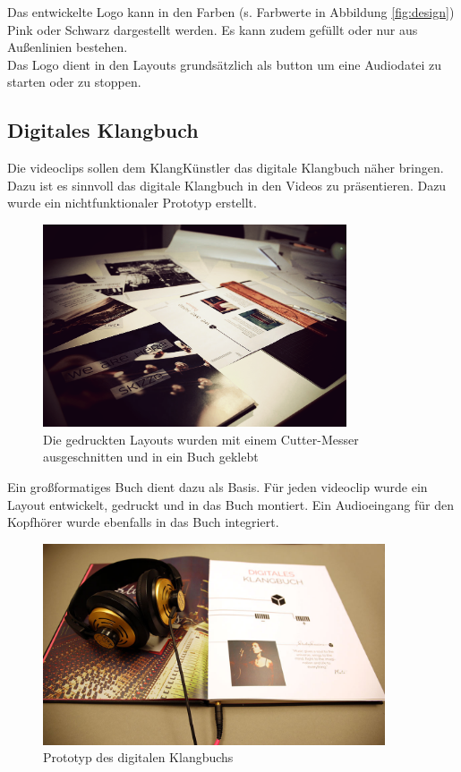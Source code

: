 Das entwickelte Logo kann in den Farben (s. Farbwerte in Abbildung \ref{fig:design}) Pink oder Schwarz dargestellt werden. Es kann zudem gefüllt oder nur aus Außenlinien bestehen.\\
Das Logo dient in den Layouts grundsätzlich als \gls{button} um eine Audiodatei zu starten oder zu stoppen.



\subsection{Digitales Klangbuch}

Die \gls{videoclip}s sollen dem KlangKünstler das digitale Klangbuch näher bringen. Dazu ist es sinnvoll das digitale Klangbuch in den Videos zu präsentieren. Dazu wurde ein nichtfunktionaler Prototyp erstellt.\\

\begin{figure}[H]
\centering
\includegraphics[width=0.8\textwidth]{grafiken/cutting.png}
\caption{Die gedruckten Layouts wurden mit einem Cutter-Messer ausgeschnitten und in ein Buch geklebt}
\end{figure}


Ein großformatiges Buch dient dazu als Basis. Für jeden \gls{videoclip} wurde ein Layout entwickelt, gedruckt und in das Buch montiert. Ein Audioeingang für den Kopfhörer wurde ebenfalls in das Buch integriert.\\


\begin{figure}[H]
\centering
\includegraphics[width=0.9\textwidth]{grafiken/gebautes_klangbuch.jpg}
\caption{Prototyp des digitalen Klangbuchs}
\end{figure}

